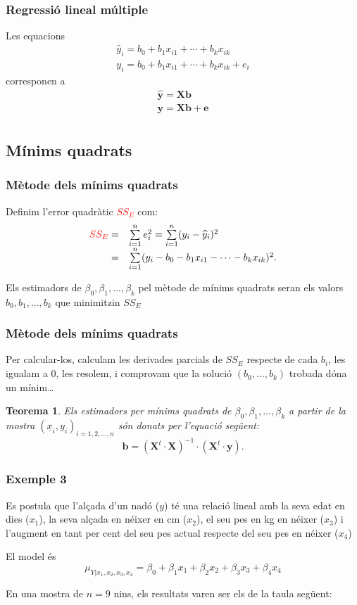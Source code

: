 \documentclass[12pt,t]{beamer}
\newcommand{\red}[1]{\textcolor{red}{#1}}
\renewcommand{\emph}[1]{{\color{red}#1}}
\theoremstyle{plain}
\newtheorem{teorema}{Teorema}
\theoremstyle{definition}
\begin{document}
\begin{frame}[fragile]
\frametitle{Regressió lineal múltiple}
Les equacions
$$
\begin{array}{l}
\widehat{y}_i=b_0+b_1 x_{i 1}+\cdots+b_{k} x_{i k}\\
y_i=b_0+b_1 x_{i 1}+\cdots+b_{k} x_{i k}+e_i
\end{array}
$$
corresponen a
$$
\begin{array}{l}
\mathbf{\widehat{y}} = \mathbf{X}\mathbf{b} \\
\mathbf{y}=   \mathbf{X}\mathbf{b}+\mathbf{e}\\
\end{array}
$$
\end{frame}

\subsection{Mínims quadrats}
\begin{frame}
\frametitle{Mètode dels mínims quadrats}

Definim l'\emph{error quadràtic} \red{$SS_E$} com:
$$
\begin{array}{rl}
\red{SS_E}=&\sum\limits_{i=1}^n
e^2_i=\sum\limits_{i=1}^n (y_i-\widehat{y}_i)^2 \\
=&\sum\limits_{i=1}^n (y_i-b_0-b_1 x_{i 1}-\cdots -b_{k} x_{ik})^2.
\end{array}
$$

Els estimadors de $\beta_0,\beta_1,\ldots, \beta_k$ pel mètode de mínims quadrats seran els
valors $b_0,b_1,\ldots, b_k$ que minimitzin $SS_E$
\end{frame}

\begin{frame}
\frametitle{Mètode dels mínims quadrats}

Per calcular-los, calculam les derivades parcials de $SS_E$ respecte de cada $b_i$, les igualam a 0, les resolem, i comprovam que la solució $(b_0,\ldots,b_k)$ trobada dóna un mínim\ldots
\medskip

\begin{teorema}
Els estimadors per mínims quadrats de $\beta_0,\beta_1,\ldots,\beta_k$ a partir de la mostra 
$(\underline{x}_{i},y_i)_{i=1,2,\ldots,n}$ són donats per l'equació següent:
$$
\mathbf{b}=\left(\mathbf{X}^t\cdot \mathbf{X}
\right)^{-1}\cdot \left(\mathbf{X}^t \cdot \mathbf{y}\right).
$$
\end{teorema}
\end{frame}

\begin{frame}
\frametitle{Exemple 3}

Es postula que l'alçada d'un nadó ($y$) té
una relació  lineal amb la seva edat en dies ($x_1$), la seva alçada en néixer en
cm ($x_2$), el seu pes en kg en néixer ($x_3$) i l'augment en tant per cent del seu pes actual respecte del seu pes en néixer ($x_4$)
\medskip

El model és
$$
\mu_{Y|x_1,x_2,x_3,x_4}=\beta_0+\beta_1x_1+\beta_2x_2+\beta_3x_3+\beta_4x_4
$$
\medskip

En una mostra de $n=9$
nins, els resultats varen ser els de la taula següent:
\end{frame}
\end{document}
